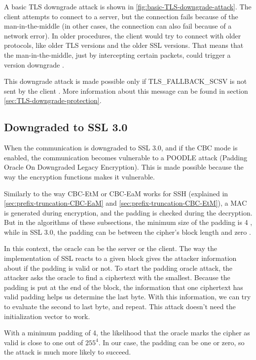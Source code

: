 \documentclass[journal=tches,final]{iacrtrans}
\begin{document}
A basic TLS downgrade attack is shown in \autoref{fig:basic-TLS-downgrade-attack}. The client attempts to connect to a server, but the connection fails because of the man-in-the-middle (in other cases, the connection can also fail because of a network error). In older procedures, the client would try to connect with older protocols, like older TLS versions and the older SSL versions. That means that the man-in-the-middle, just by intercepting certain packets, could trigger a version downgrade \cite{tls-downgrade-1}.

This downgrade attack is made possible only if TLS\_FALLBACK\_SCSV is not sent by the client \cite{TLS-Fallback-Signaling-Cipher-Suite-Value}. More information about this message can be found in section \autoref{sec:TLS-downgrade-protection}.


\subsection{Downgraded to SSL 3.0}

When the communication is downgraded to SSL 3.0, and if the CBC mode is enabled, the communication becomes vulnerable to a POODLE attack (Padding Oracle On Downgraded Legacy Encryption). This is made possible because the way the encryption functions makes it vulnerable.

Similarly to the way CBC-EtM or CBC-EaM works for SSH (explained in \autoref{sec:prefix-truncation-CBC-EaM} and \autoref{sec:prefix-truncation-CBC-EtM}), a MAC is generated during encryption, and the padding is checked during the decryption. But in the algorithms of these subsections, the minimum size of the padding is 4 \cite{terrapin-attack}, while in SSL 3.0, the padding can be between the cipher's block length and zero \cite{ssl-protocol-ver-3}.

In this context, the oracle can be the server or the client. The way the implementation of SSL reacts to a given block gives the attacker information about if the padding is valid or not. To start the padding oracle attack, the attacker asks the oracle to find a ciphertext with the smallest. Because the padding is put at the end of the block, the information that one ciphertext has valid padding helps us determine the last byte. With this information, we can try to evaluate the second to last byte, and repeat. This attack doesn't need the initialization vector to work.

With a minimum padding of 4, the likelihood that the oracle marks the cipher as valid is close to one out of $255^{4}$. In our case, the padding can be one or zero, so the attack is much more likely to succeed.
\end{document}
